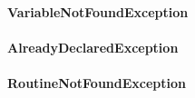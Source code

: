 \documentclass[parskip=full]{scrartcl}
\begin{document}
\paragraph{VariableNotFoundException}
\paragraph{AlreadyDeclaredException}
\paragraph{RoutineNotFoundException}
\end{document}
